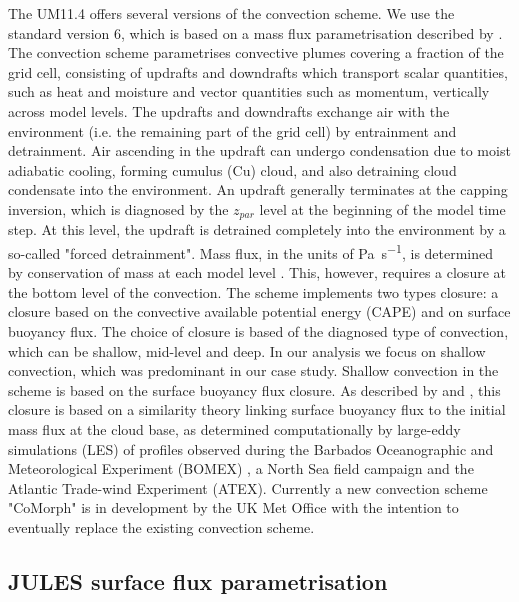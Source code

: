 The UM11.4 offers several versions of the convection scheme. We use the standard
version 6, which is based on a mass flux parametrisation described by \cite{gregory1990}.
The convection scheme parametrises convective plumes covering a fraction of the grid cell,
consisting of updrafts and downdrafts which transport scalar quantities,
such as heat and moisture and vector quantities such as momentum, vertically
across model levels. The updrafts and downdrafts exchange air with the
environment (i.e. the remaining part of the grid cell) by entrainment and
detrainment. Air ascending in the updraft can undergo condensation due to
moist adiabatic cooling, forming cumulus (Cu) cloud, and also detraining cloud
condensate into the environment. An updraft generally terminates at the capping
inversion, which is diagnosed by the $z_{par}$ level at the beginning of the
model time step. At this level, the updraft
is detrained completely into the environment by a so-called "forced detrainment".
Mass flux, in the units of \unit{Pa.s^{-1}}, is determined by
conservation of mass at each model level \citep{gregory1990}. This, however,
requires a closure at the bottom level of the convection. The scheme implements
two types closure: a closure based on the
convective available potential energy (CAPE) and on surface buoyancy flux.
The choice of closure is based of the diagnosed type of convection, which can be
shallow, mid-level and deep. In our analysis we focus on shallow convection,
which was predominant in our case study. Shallow convection in the scheme is based on the
surface buoyancy flux closure. As described by \cite{grant1999} and \cite{grant2001},
this closure is based on a similarity
theory linking surface buoyancy flux to the initial mass flux at the cloud
base, as determined computationally by large-eddy simulations (LES) of profiles
observed during the Barbados Oceanographic and Meteorological Experiment (BOMEX)
\citep{davidson1968}, a North Sea field campaign \citep{smith1995} and the Atlantic Trade-wind
Experiment (ATEX). Currently a new convection scheme "CoMorph" is in development by the UK Met Office
with the intention to eventually replace the existing convection scheme.

\subsection{JULES surface flux parametrisation}
\label{sec:jules}

